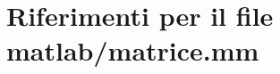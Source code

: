 \hypertarget{matrice_8mm}{\section{Riferimenti per il file matlab/matrice.mm}
\label{matrice_8mm}
}
